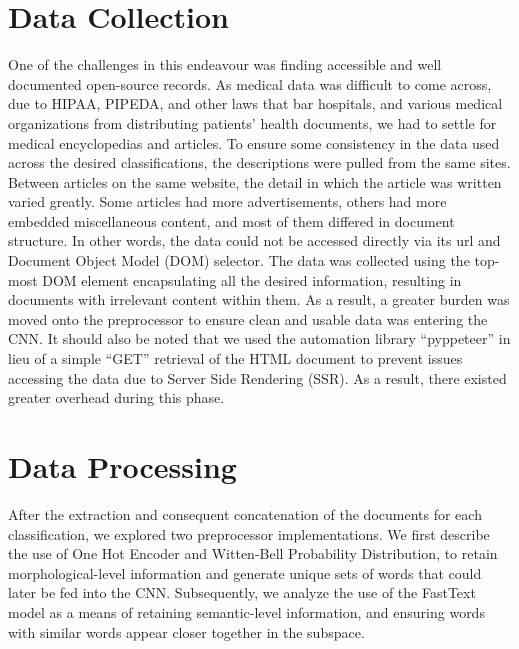 \documentclass[12pt]{report}
\begin{document}
\section{Data Collection}
One of the challenges in this endeavour was finding accessible and well
documented open-source records. As medical data was difficult to come across, due
to HIPAA, PIPEDA, and other laws that bar hospitals, and various medical
organizations from distributing patients' health documents, we had to settle
for medical encyclopedias and articles. To ensure some consistency in the data used across
the desired classifications, the descriptions were pulled from the same sites.
Between articles on the same website, the detail in which the article
was written varied greatly. Some articles had more advertisements, others had
more embedded miscellaneous content, and most of them differed in document
structure. In other words, the data could not be accessed directly via its url
and Document Object Model (DOM) selector. The data was collected using the top-most DOM element
encapsulating all the desired information, resulting in documents with
irrelevant content within them.  As a result, a greater burden was moved onto
the preprocessor to ensure clean and usable data was entering the CNN. It
should also be noted that we used the automation library “pyppeteer” in lieu of
a simple “GET” retrieval of the HTML document to prevent issues accessing the
data due to Server Side Rendering (SSR). As a result, there existed greater
overhead during this phase.

\section{Data Processing}
After the extraction and consequent concatenation of the documents for each
classification, we explored two preprocessor implementations. We first describe
the use of One Hot Encoder\cite{scikit-learn} and Witten-Bell Probability Distribution\cite{bird2009natural}, to retain
morphological-level information and generate unique sets of words that could
later be fed into the CNN. Subsequently, we analyze the use of the FastText\cite{rehurek2011gensim}
model as a means of retaining semantic-level information, and ensuring words
with similar words appear closer together in the subspace.
\end{document}
